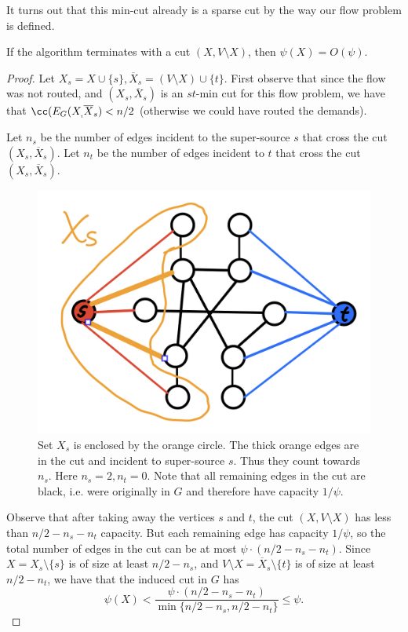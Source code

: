 It turns out that this min-cut already is a sparse cut by the way our flow problem is defined.

\begin{lemma}
If the algorithm terminates with a cut $(X, V \setminus X)$, then $\psi(X) = O(\psi)$. \end{lemma}
\begin{proof}
Let $X_s = X \cup \{s\}, \overline{X}_s = (V \setminus X) \cup \{t\}$. First observe that since the flow was not routed, and $(X_s, \overline{X}_s)$ is an $st$-min cut for this flow problem, we have that $\cc(E_G(X_, \overline{X}_s) < n/2$ (otherwise we could have routed the demands).

Let $n_s$ be the number of edges incident to the super-source $s$ that cross the cut $(X_s, \overline{X}_{s})$. Let $n_t$ be the number of edges incident to $t$ that cross the cut $(X_s, \overline{X}_{s})$.

\begin{figure}[!ht]
    \centering
    \includegraphics[scale=0.2]{./fig/FewEdgesCrossCut_lectureCutMatching.jpeg}
    \caption{Set $X_s$ is enclosed by the orange circle. The thick orange edges are in the cut and incident to super-source $s$. Thus they count towards $n_s$. Here $n_s = 2, n_t = 0$. Note that all remaining edges in the cut are black, i.e. were originally in $G$ and therefore have capacity $1/\psi$.}
\end{figure}

Observe that after taking away the vertices $s$ and $t$, the cut $(X, V \setminus X)$ has less than $n/2 - n_s - n_t$ capacity. But each remaining edge has capacity $1/\psi$, so the total number of edges in the cut can be at most $\psi \cdot (n/2 - n_s - n_t)$. Since $X = X_s \setminus \{s\}$ is of size at least $n/2-n_s$, and $V \setminus X = \overline{X}_{s} \setminus \{t\}$ is of size at least $n/2-n_t$, we have that the induced cut in $G$ has
\[
    \psi(X) < \frac{\psi \cdot (n/2 - n_s - n_t)}{\min\{ n/2 - n_s, n/2 - n_t\}} \leq \psi.
\]
\end{proof}

